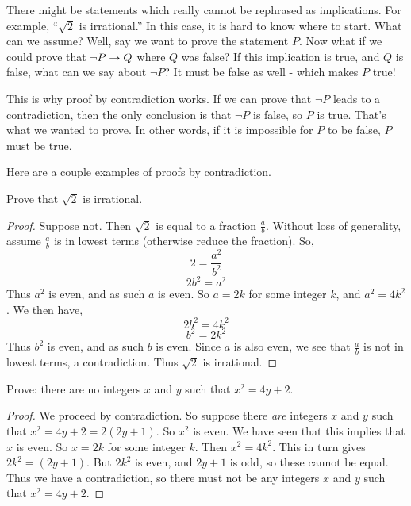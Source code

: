 \documentclass[12pt]{article}
\begin{document}
There might be statements which really cannot be rephrased as implications.  For example, ``$\sqrt 2$ is irrational.''  In this case, it is hard to know where to start. What can we assume? Well, say we want to prove the statement $P$.  Now what if we could prove that $\neg P \rightarrow Q$ where $Q$ was false?  If this implication is true, and $Q$ is false, what can we say about $\neg P$?  It must be false as well - which makes $P$ true!  
   
 This is why proof by contradiction works.  If we can prove that $\neg P$ leads to a contradiction, then the only conclusion is that $\neg P$ is false, so $P$ is true.  That's what we wanted to prove.  In other words, if it is impossible for $P$ to be false, $P$ must be true.
 
 Here are a couple examples of proofs by contradiction.
   
   \begin{example}Prove that $\sqrt{2}$ is irrational.
   
   \begin{proof}
 	Suppose not.  Then $\sqrt 2$ is equal to a fraction $\frac{a}{b}$.  Without loss of generality, assume $\frac{a}{b}$ is in lowest terms (otherwise reduce the fraction).  So,
 	\[2 = \frac{a^2}{b^2}\]
 	\[2b^2 = a^2\]
 	Thus $a^2$ is even, and as such $a$ is even.  So $a = 2k$ for some integer $k$, and $a^2 = 4k^2$.  We then have,
 	\[2b^2 = 4k^2\]
 	\[b^2 = 2k^2\]
 	Thus $b^2$ is even, and as such $b$ is even.  Since $a$ is also even, we see that $\frac{a}{b}$ is not in lowest terms, a contradiction.  Thus $\sqrt 2$ is irrational.
 \end{proof}
  \end{example}
  
\begin{example} Prove: there are no integers $x$ and $y$ such that $x^2  = 4y + 2$. 
 \begin{proof}
 	We proceed by contradiction.  So suppose there {\em are} integers $x$ and $y$ such that $x^2 = 4y + 2 = 2(2y + 1)$.  So $x^2$ is even.  We have seen that this implies that $x$ is even.  So $x = 2k$ for some integer $k$.  Then $x^2 = 4k^2$.  This in turn gives
 	$2k^2 = (2y + 1)$.  But $2k^2$ is even, and $2y + 1$ is odd, so these cannot be equal.  Thus we have a contradiction, so there must not be any integers $x$ and $y$ such that $x^2 = 4y + 2$.
 \end{proof}
 \end{example}
 
\end{document}
